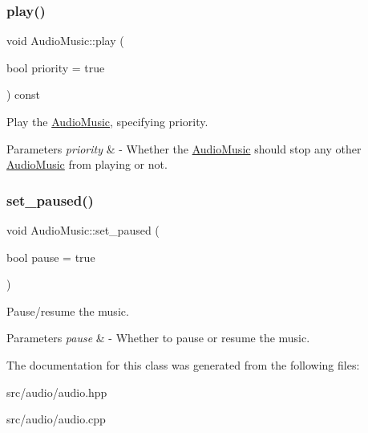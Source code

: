 \subsubsection{\texorpdfstring{play()}{play()}}
{\footnotesize\ttfamily void Audio\+Music\+::play (\begin{DoxyParamCaption}\item[{bool}]{priority = {\ttfamily true} }\end{DoxyParamCaption}) const}

Play the \mbox{\hyperlink{class_audio_music}{Audio\+Music}}, specifying priority. 
\begin{DoxyParams}{Parameters}
{\em priority} & -\/ Whether the \mbox{\hyperlink{class_audio_music}{Audio\+Music}} should stop any other \mbox{\hyperlink{class_audio_music}{Audio\+Music}} from playing or not. \\
\hline
\end{DoxyParams}
\mbox{\label{class_audio_music_a5de1c2fc9f565af444c48b85b56d7c8f}} 
\subsubsection{\texorpdfstring{set\+\_\+paused()}{set\_paused()}}
{\footnotesize\ttfamily void Audio\+Music\+::set\+\_\+paused (\begin{DoxyParamCaption}\item[{bool}]{pause = {\ttfamily true} }\end{DoxyParamCaption})}

Pause/resume the music. 
\begin{DoxyParams}{Parameters}
{\em pause} & -\/ Whether to pause or resume the music. \\
\hline
\end{DoxyParams}


The documentation for this class was generated from the following files\+:\begin{DoxyCompactItemize}
\item 
src/audio/audio.\+hpp\item 
src/audio/audio.\+cpp\end{DoxyCompactItemize}
